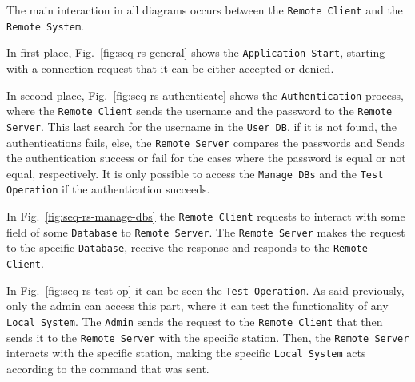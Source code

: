 The main interaction in all diagrams occurs between the \texttt{Remote Client} and the \texttt{Remote System}.

In first place, Fig.~\ref{fig:seq-rs-general} shows the \texttt{Application Start}, starting with a connection request that it can be either accepted or denied.

In second place, Fig.~\ref{fig:seq-rs-authenticate} shows the \texttt{Authentication} process, where the \texttt{Remote Client} sends the username and the password to the \texttt{Remote Server}.
This last search for the username in the \texttt{User DB}, if it is not found, the authentications fails, else, the \texttt{Remote Server} compares the passwords and Sends the authentication success or fail for the cases where the password is equal or not equal, respectively.
It is only possible to access the \texttt{Manage DBs} and the \texttt{Test Operation} if the authentication succeeds.

In Fig.~\ref{fig:seq-rs-manage-dbs} the \texttt{Remote Client} requests to interact with some field of some \texttt{Database} to \texttt{Remote Server}.
The \texttt{Remote Server} makes the request to the specific \texttt{Database}, receive the response and responds to the \texttt{Remote Client}.

In Fig.~\ref{fig:seq-rs-test-op} it can be seen the \texttt{Test Operation}.
As said previously, only the admin can access this part, where it can test the functionality of any \texttt{Local System}.
The \texttt{Admin} sends the request to the \texttt{Remote Client} that then sends it to the \texttt{Remote Server} with the specific station.
Then, the \texttt{Remote Server} interacts with the specific station, making the specific \texttt{Local System} acts according to the command that was sent.  
